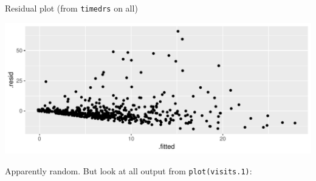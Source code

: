 \begin{frame}[fragile]{Residual plot (from \texttt{timedrs} on all)}
 
\begin{knitrout}
\color{fgcolor}\begin{kframe}
\begin{alltt}
\hlstd{(}\hlopt{+}\hlstd{()}
\end{alltt}
\end{kframe}
\includegraphics[width=\maxwidth]{figure/iffy8-1} 

\end{knitrout}

Apparently random. But look at all output from \texttt{plot(visits.1)}:


\end{frame}

